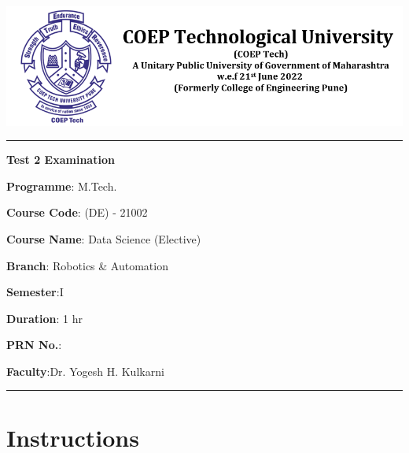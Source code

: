 \documentclass[11pt,paper=a4]{exam}
\date{}
\begin{document}
\begin{center}
\includegraphics[width=\linewidth]{images/coep_new_logo.png}

\rule{\textwidth}{1pt}

\vspace{2ex}

{\huge{\bf {Test 2 Examination}}}
\end{center}



\thispagestyle{empty}

\begin{minipage}[t]{.5\textwidth}%
{\bf Programme}: M.Tech.\par
\vspace{1ex}
{\bf Course Code}: (DE) - 21002   \par
\vspace{1ex}
{\bf Course Name}: Data Science (Elective)\par
\vspace{1ex}
{\bf Branch}: Robotics \& Automation
\end{minipage}%
\hfill
\begin{minipage}[t]{.4\textwidth}%
{\bf Semester}:I \par
\vspace{1ex} 
{\bf Duration}: 1 hr \par
\vspace{1ex}
{\bf PRN No.}:\makebox[.5\textwidth]{\hrulefill}  \par
\vspace{1ex}
{\bf Faculty}:Dr. Yogesh H. Kulkarni
\end{minipage}

\vspace{2ex}
\rule{\textwidth}{1pt}

\section*{Instructions}

\begin{center}
\end{center}
\end{document}
